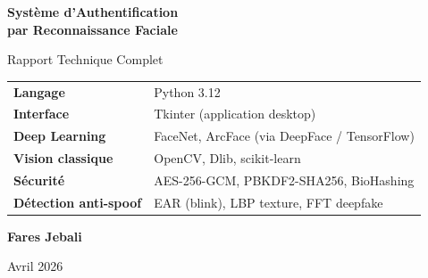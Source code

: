 \documentclass[12pt,a4paper]{article}
\begin{document}

\begin{titlepage}
  \centering
  \vspace*{1cm}

  {\Huge\bfseries\color{TitleBlue}
    Système d'Authentification\\[0.4em]
    par Reconnaissance Faciale\par}

  \vspace{0.6cm}
  {\large\color{gray} Rapport Technique Complet\par}

  \vspace{1.5cm}

  \vspace{1.5cm}

  \begin{tcolorbox}[
    colback=LightGray,
    colframe=TitleBlue,
    width=0.85\textwidth,
    arc=6pt,
    title={\bfseries\color{white} Vue d'ensemble du système},
    coltitle=white,
    attach boxed title to top center={yshift=-3mm},
    boxed title style={colback=TitleBlue,arc=3pt},
  ]
    \centering
    \small
    \begin{tabular}{ll}
      \textbf{Langage} & Python 3.12 \\
      \textbf{Interface} & Tkinter (application desktop) \\
      \textbf{Deep Learning} & FaceNet, ArcFace (via DeepFace / TensorFlow) \\
      \textbf{Vision classique} & OpenCV, Dlib, scikit-learn \\
      \textbf{Sécurité} & AES-256-GCM, PBKDF2-SHA256, BioHashing \\
      \textbf{Détection anti-spoof} & EAR (blink), LBP texture, FFT deepfake \\
    \end{tabular}
  \end{tcolorbox}

  \vspace{2cm}

  {\large\bfseries Fares Jebali\par}
  \vspace{0.3cm}
  {\normalsize Avril 2026\par}

  \vfill
\end{titlepage}
\end{document}

